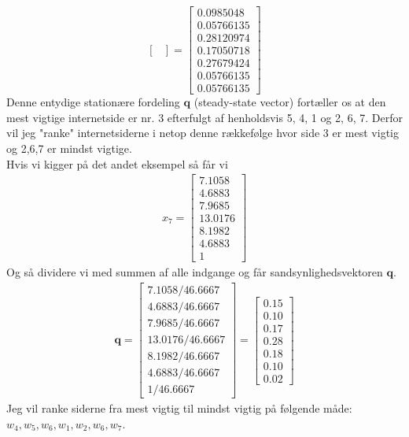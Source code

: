 \documentclass[10pt,a4paper]{article}
\begin{document}
\begin{enumerate}
\[\begin{bmatrix}
	 \end{bmatrix}
	 =
	 \begin{bmatrix}
		0.0985048\\0.05766135\\0.28120974\\0.17050718\\0.27679424\\0.05766135\\0.05766135
	\end{bmatrix}\]
	Denne entydige stationære fordeling $\mathbf{q}$ (steady-state vector) fortæller os at den mest vigtige internetside er nr. 3 efterfulgt af henholdsvis 5, 4, 1 og 2, 6, 7. Derfor vil jeg "ranke" internetsiderne i netop denne rækkefølge hvor side 3 er mest vigtig og 2,6,7 er mindst vigtige.\\
	Hvis vi kigger på det andet eksempel så får vi
	\begin{align}
		x_7=\begin{bmatrix}
			7.1058 \\ 4.6883 \\ 7.9685 \\ 13.0176 \\ 8.1982 \\ 4.6883 \\ 1
		\end{bmatrix}
	\end{align}
	Og så dividere vi med summen af alle indgange og får sandsynlighedsvektoren $\mathbf{q}$.
	\begin{align}
		\mathbf{q}=\begin{bmatrix}
			7.1058/46.6667 \\ 4.6883/46.6667 \\ 7.9685/46.6667 \\ 13.0176/46.6667 \\ 8.1982/46.6667 \\ 4.6883/46.6667 \\ 1/46.6667
		\end{bmatrix}=\begin{bmatrix}
			0.15 \\ 0.10 \\ 0.17 \\ 0.28 \\ 0.18 \\ 0.10 \\ 0.02
		\end{bmatrix}
	\end{align}
	Jeg vil ranke siderne fra mest vigtig til mindst vigtig på følgende måde: $w_4,w_5,w_6,w_1,w_2,w_6,w_7$.

\end{enumerate}
\end{document}
